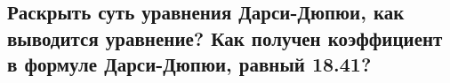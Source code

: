 

\subsection{Раскрыть суть уравнения Дарси-Дюпюи, как выводится уравнение? Как получен коэффициент в формуле Дарси-Дюпюи, равный 18.41?}

